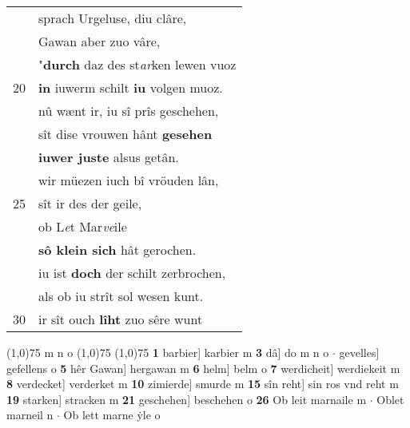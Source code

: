 \documentclass[8pt,a4paper,notitlepage]{article}
\begin{document}
\begin{table}[ht]
\begin{minipage}[t]{0.5\linewidth}
\begin{tabular}{rl}
 & sprach Urgeluse, diu clâre,\\ 
 & Gawan aber zuo vâre,\\ 
 & "\textbf{durch} daz des st\textit{ar}ken lewen vuoz\\ 
20 & \textbf{in} iuwerm schilt \textbf{iu} volgen muoz.\\ 
 & nû wænt ir, iu sî prîs geschehen,\\ 
 & sît dise vrouwen hânt \textbf{gesehen}\\ 
 & \textbf{iuwer juste} alsus getân.\\ 
 & wir müezen iuch bî vröuden lân,\\ 
25 & sît ir des der geile,\\ 
 & ob L\textit{e}t Mar\textit{ve}ile\\ 
 & \textbf{sô klein sich} hât gerochen.\\ 
 & iu ist \textbf{doch} der schilt zerbrochen,\\ 
 & als ob iu strît sol wesen kunt.\\ 
30 & ir sît ouch \textbf{lîht} zuo sêre wunt\\ 
\end{tabular}
\scriptsize
\line(1,0){75} \newline
m n o \newline
\line(1,0){75} \newline
\newline
\line(1,0){75} \newline
\textbf{1} barbier] karbier m \textbf{3} dâ] do m n o  $\cdot$ gevelles] gefellens o \textbf{5} hêr Gawan] hergawan m \textbf{6} helm] belm o \textbf{7} werdicheit] werdiekeit m \textbf{8} verdecket] verderket m \textbf{10} zimierde] smurde m \textbf{15} sîn reht] sin ros vnd reht m \textbf{19} starken] stracken m \textbf{21} geschehen] beschehen o \textbf{26} Ob leit marnaile m  $\cdot$ Oblet marneil n  $\cdot$ Ob lett marne ẏle o \newline
\end{minipage}
\end{table}
\newpage
\end{document}
